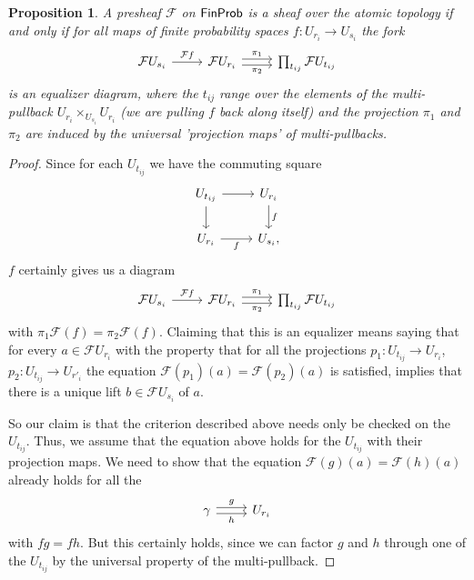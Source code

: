 \documentclass[a4paper]{amsproc}
\theoremstyle{plain}
\newtheorem{proposition}[theorem]{Proposition}
\theoremstyle{definition}
\theoremstyle{remark}
\numberwithin{equation}{section}
\newcommand{\FinProb}{\textup{\textsf{FinProb}}}
\begin{document}
\begin{proposition} \label{sheaf_condition}
A presheaf $\mathcal{F}$ on $\FinProb$ is a sheaf over the atomic topology if and only if for all maps of finite probability spaces $f: U_{r_i} \to U_{s_i}$ the fork
\[
\begin{tikzcd}
\mathcal{F} U_{s_i} \arrow[r, "\mathcal{F}f"] &
\mathcal{F} U_{r_i} \arrow[r, "\pi_1", shift left] \arrow[r, "\pi_2"', shift right] & \prod_{t_{ij}} \mathcal{F} U_{t_{ij}}
\end{tikzcd}
\]
is an equalizer diagram, where the $t_{ij}$ range over the elements of the multi-pullback $U_{r_i} \times_{U_{s_i}} U_{r_i}$ (we are pulling $f$ back along itself) and the projection $\pi_1$ and $\pi_2$ are induced by the universal 'projection maps' of multi-pullbacks.
\end{proposition}
\begin{proof}
Since for each $U_{t_{ij}}$ we have the commuting square
\[
\begin{tikzcd}
U_{t_{ij}} \arrow[r] \arrow[d] & {U_{r_i}} \arrow[d, "f"] \\
{U_{r_i}} \arrow[r, "f"']            & {U_{s_i}} ,
\end{tikzcd}
\]
$f$ certainly gives us a diagram
\[
\begin{tikzcd}
\mathcal{F} U_{s_i} \arrow[r, "\mathcal{F}f"] & \mathcal{F} U_{r_i} \arrow[r, "\pi_1", shift left] \arrow[r, "\pi_2"', shift right] & \prod_{t_{ij}} \mathcal{F} U_{t_{ij}}
\end{tikzcd}
\]
with $\pi_1 \mathcal{F}(f) = \pi_2 \mathcal{F}(f)$. Claiming that this is an equalizer means saying that for every $a \in \mathcal{F}U_{r_i}$ with the property that for all the projections $p_1: U_{t_{ij}} \to U_{r_i}$, $p_2: U_{t_{ij}} \to U_{r'_i}$ the equation $\mathcal{F}(p_1)(a) = \mathcal{F}(p_2)(a)$ is satisfied, implies that there is a unique lift $b \in \mathcal{F}U_{s_i}$ of $a$.

So our claim is that the criterion described above needs only be checked on the $U_{t_{ij}}$. Thus, we assume that the equation above holds for the $U_{t_{ij}}$ with their projection maps. We need to show that the equation $\mathcal{F}(g)(a) = \mathcal{F}(h)(a)$ already holds for all the \[
\begin{tikzcd}
\gamma \arrow[r, "g", shift left] \arrow[r, "h"', shift right] & U_{r_i}
\end{tikzcd}
\]
with $fg = fh$. But this certainly holds, since we can factor $g$ and $h$ through one of the $U_{t_{ij}}$ by the universal property of the multi-pullback.
\end{proof}
\end{document}
